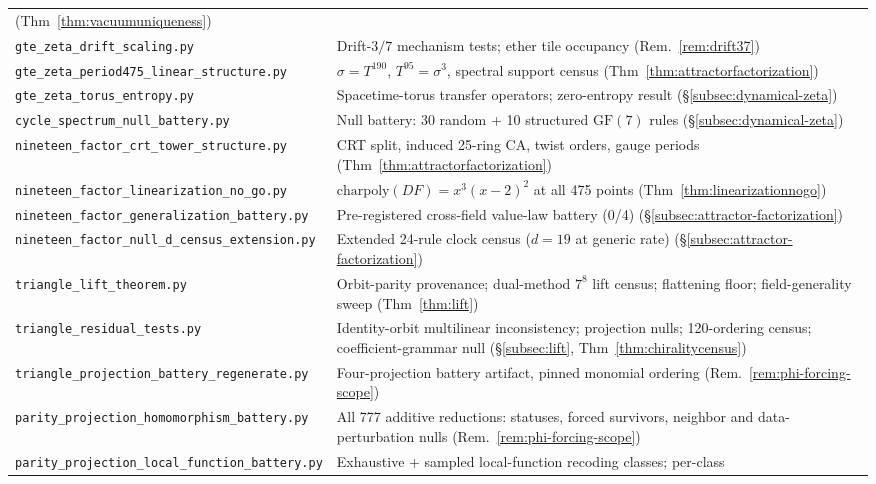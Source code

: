\documentclass[11pt]{article}
\theoremstyle{remark}
\newcommand{\GF}[1]{\ensuremath{\mathrm{GF}(#1)}}
\begin{document}
\begin{appendices}
\begin{center}
\begin{tabular}{@{}p{7.2cm}p{5.8cm}@{}}
    (Thm~\ref{thm:vacuumuniqueness}) \\
\texttt{gte\_zeta\_drift\_scaling.py}
  & Drift-$3/7$ mechanism tests; ether tile occupancy
    (Rem.~\ref{rem:drift37}) \\
\texttt{gte\_zeta\_period475\_linear\_structure.py}
  & $\sigma = T^{190}$, $T^{95} = \sigma^3$, spectral support census
    (Thm~\ref{thm:attractorfactorization}) \\
\texttt{gte\_zeta\_torus\_entropy.py}
  & Spacetime-torus transfer operators; zero-entropy result
    (§\ref{subsec:dynamical-zeta}) \\
\texttt{cycle\_spectrum\_null\_battery.py}
  & Null battery: 30 random + 10 structured $\GF{7}$ rules
    (§\ref{subsec:dynamical-zeta}) \\
\texttt{nineteen\_factor\_crt\_tower\_structure.py}
  & CRT split, induced 25-ring CA, twist orders, gauge periods
    (Thm~\ref{thm:attractorfactorization}) \\
\texttt{nineteen\_factor\_linearization\_no\_go.py}
  & $\mathrm{charpoly}(DF) = x^3(x-2)^2$ at all 475 points
    (Thm~\ref{thm:linearizationnogo}) \\
\texttt{nineteen\_factor\_generalization\_battery.py}
  & Pre-registered cross-field value-law battery (0/4)
    (§\ref{subsec:attractor-factorization}) \\
\texttt{nineteen\_factor\_null\_d\_census\_extension.py}
  & Extended 24-rule clock census ($d = 19$ at generic rate)
    (§\ref{subsec:attractor-factorization}) \\
\texttt{triangle\_lift\_theorem.py}
  & Orbit-parity provenance; dual-method $7^8$ lift census; flattening
    floor; field-generality sweep (Thm~\ref{thm:lift}) \\
\texttt{triangle\_residual\_tests.py}
  & Identity-orbit multilinear inconsistency; projection nulls;
    120-ordering census; coefficient-grammar null
    (§\ref{subsec:lift}, Thm~\ref{thm:chiralitycensus}) \\
\texttt{triangle\_projection\_battery\_regenerate.py}
  & Four-projection battery artifact, pinned monomial ordering
    (Rem.~\ref{rem:phi-forcing-scope}) \\
\texttt{parity\_projection\_homomorphism\_battery.py}
  & All 777 additive reductions: statuses, forced survivors, neighbor
    and data-perturbation nulls (Rem.~\ref{rem:phi-forcing-scope}) \\
\texttt{parity\_projection\_local\_function\_battery.py}
  & Exhaustive + sampled local-function recoding classes; per-class

\end{tabular}
\end{center}
\end{appendices}
\end{document}
